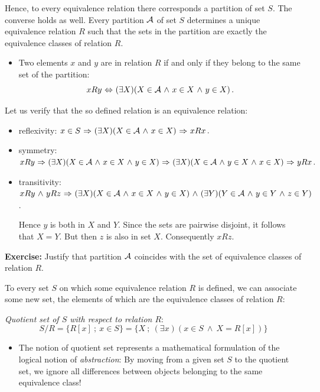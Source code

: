 \documentclass[11pt,paper=b5,footinclude,headinclude]{scrbook} %
\def\inn {{~\wedge~}}
\def\sledi {{~\Rightarrow~}}
\def\cee {{~\Leftrightarrow~}}
\theoremstyle{remark}
\theoremstyle{definition} %
\theoremstyle{theorem} %
\begin{document}
Hence, to every equivalence relation there corresponds a partition of set $S$.
The converse holds as well. Every partition ${\cal A}$ of set $S$ determines a unique equivalence relation $R$
such that the sets in the partition are exactly the equivalence classes of relation $R$.
\begin{itemize}
  \item Two elements $x$ and $y$ are in relation $R$ if and only if they belong to the same set of the partition:
      $$xRy\cee (\exists X)(X\in {\cal A}\inn x\in X\inn y\in X)\,.$$
\end{itemize}
Let us verify that the so defined relation is an equivalence relation:
\begin{itemize}
  \item reflexivity: $x\in S \sledi (\exists X)(X\in {\cal A}\inn x\in X)\sledi xRx\,.$
  \item symmetry:
  $xRy\sledi (\exists X)(X\in {\cal A}\inn x\in X\inn y\in X)
  \sledi (\exists X)(X\in {\cal A}\inn y\in X\inn x\in X)\sledi yRx\,.$
  \item transitivity:
  $xRy \inn yRz\sledi (\exists X)(X\in {\cal A}\inn x\in X\inn y\in X)
  \inn (\exists Y)(Y\in {\cal A}\inn y\in Y\inn z\in Y)$.

  Hence $y$ is both in $X$ and $Y$. Since the sets are pairwise disjoint, it follows that
  $X = Y$. But then $z$ is also in set $X$. Consequently $xRz$.
\end{itemize}

\textbf{ Exercise:} Justify that partition ${\cal A}$ coincides with the set of equivalence classes of relation $R$.

\bigskip


To every set $S$ on which some equivalence relation $R$ is defined, we can associate some new set, the elements of which are the equivalence classes of relation $R$:

{\em Quotient set of $S$ with respect to relation $R$}:
$$S/R = \{R[x]~;~x\in S\}=\{X~;~(\exists x)(x\in S \inn X = R[x])\}$$
\begin{itemize}
  \item The notion of quotient set represents a mathematical formulation of the logical notion of {\em abstraction}:
  By moving from a given set $S$ to the quotient set, we ignore all differences between objects belonging to the same equivalence class!
\end{itemize}
\end{document}
